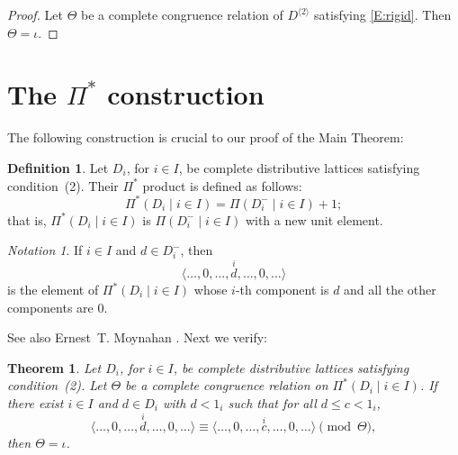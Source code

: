 \documentclass{amsart}
\theoremstyle{plain}
\newtheorem{theorem}{Theorem}
\theoremstyle{definition}
\newtheorem{definition}{Definition}
\theoremstyle{remark}
\newtheorem*{notation}{Notation}
\numberwithin{equation}{section}
\begin{document}
\begin{proof}
   Let $\Theta$ be a complete congruence relation of 
   $D^{\langle 2 \rangle}$ satisfying \eqref{E:rigid}. Then $\Theta =
\iota$. 
\end{proof}

\section{The $\Pi^{*}$ construction}\label{S:P*} 
The following construction is crucial to our proof of the Main Theorem:

\begin{definition}\label{D:P*} 
   Let $D_{i}$, for $i \in I$, be complete distributive lattices 
   satisfying condition~\textup{(2)}.  Their $\Pi^{*}$ product is defined
as 
   follows:
   \[
      \Pi^{*} ( D_{i} \mid i \in I ) = \Pi ( D_{i}^{-} \mid i \in I ) + 1;
   \]
   that is, $\Pi^{*} ( D_{i} \mid i \in I )$ is $\Pi ( D_{i}^{-} \mid 
   i \in I )$ with a new unit element. 
\end{definition}

\begin{notation} 
   If $i \in I$ and $d \in D_{i}^{-}$, then
   \[
      \langle \dots, 0, \dots, \overset{i}{d}, \dots, 0, \dots \rangle
   \]
   is the element of $\Pi^{*} ( D_{i} \mid i \in I )$ whose $i$-th 
   component is $d$ and all the other components are $0$.
\end{notation}

See also Ernest~T. Moynahan \cite{eM57a}.  Next we verify:

\begin{theorem}\label{T:P*} 
   Let $D_{i}$, for $i \in I$, be complete distributive lattices 
   satisfying condition~\textup{(2)}.  Let $\Theta$ be a complete
congruence
   relation on $\Pi^{*} ( D_{i} \mid i \in I )$.  If there exist  
   $i \in I$ and $d \in D_{i}$ with $d < 1_{i}$ such that for
   all $d \leq c < 1_{i}$, 
   \begin{equation}\label{E:cong1} 
      \langle \dots, 0, \dots,\overset{i}{d},
      \dots, 0, \dots \rangle \equiv \langle \dots, 0, \dots,
      \overset{i}{c}, \dots, 0, \dots \rangle \pmod{\Theta}, 
   \end{equation}
   then $\Theta = \iota$.
\end{theorem}
\end{document}
